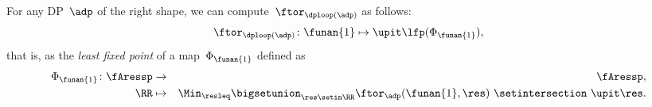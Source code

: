 \begin{theorem}
    \label{prop:loop-continuous}
    For any DP~$\adp$ of the right shape, we can compute~$\ftor_{\dploop(\adp)}$ as follows:
    \begin{equation}
        \label{eq:loop_fixpoint1}
        \ftor_{\dploop(\adp)}\colon\funan{1}\mapsto\upit\lfp(\Phi_{\funan{1}}),
    \end{equation}
    that is, as the \emph{least fixed point} of a map~$\Phi_{\funan{1}}$ defined as
    \begin{eqnarray}
        \Phi_{\funan{1}}\colon\fAressp & \to     & \fAressp,\label{eq:bigphi1} \\
        \RR                            & \mapsto & \Min_{\resleq}\bigsetunion_{\res\setin\RR}\ftor_{\adp}(\funan{1}, \res)\ \setintersection\ \upit\res.
        \nonumber
    \end{eqnarray}
\end{theorem}
